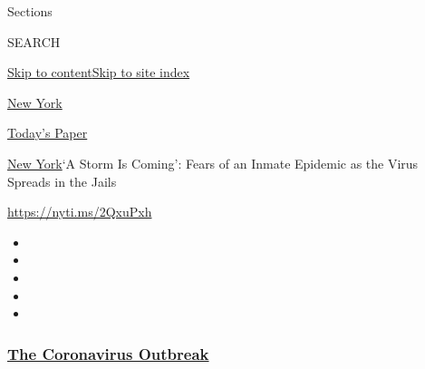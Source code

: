 Sections

SEARCH

\protect\hyperlink{site-content}{Skip to
content}\protect\hyperlink{site-index}{Skip to site index}

\href{https://www.nytimes3xbfgragh.onion/section/nyregion}{New York}

\href{https://myaccount.nytimes3xbfgragh.onion/auth/login?response_type=cookie\&client_id=vi}{}

\href{https://www.nytimes3xbfgragh.onion/section/todayspaper}{Today's
Paper}

\href{/section/nyregion}{New York}\textbar{}`A Storm Is Coming': Fears
of an Inmate Epidemic as the Virus Spreads in the Jails

\url{https://nyti.ms/2QxuPxh}

\begin{itemize}
\item
\item
\item
\item
\item
\end{itemize}

\hypertarget{the-coronavirus-outbreak}{%
\subsubsection{\texorpdfstring{\href{https://www.nytimes3xbfgragh.onion/news-event/coronavirus?name=styln-coronavirus-national\&region=TOP_BANNER\&block=storyline_menu_recirc\&action=click\&pgtype=Article\&impression_id=f12a3130-f4ba-11ea-b616-c3ae477f9ed6\&variant=undefined}{The
Coronavirus
Outbreak}}{The Coronavirus Outbreak}}\label{the-coronavirus-outbreak}}

